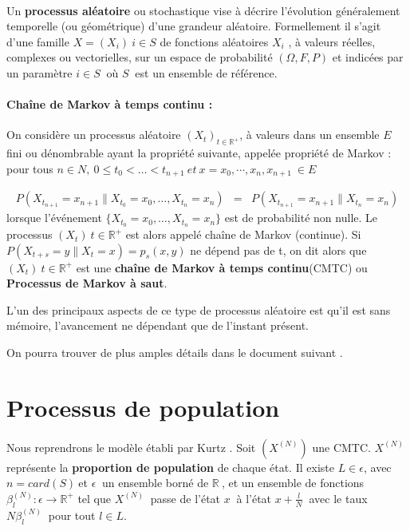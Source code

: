 \documentclass[a4paper,12pt]{report}
\def\D{\displaystyle}
\begin{document}
\paragraph{}
Un \textbf{processus aléatoire} ou stochastique vise à décrire l’évolution généralement
temporelle (ou géométrique) d’une grandeur aléatoire. Formellement il s’agit
d’une famille $\D X = (X_{i} )\ i \in S$ de fonctions aléatoires $\D
X_{i}$ , à valeurs réelles, complexes ou vectorielles, sur un espace
de probabilité $\D (\Omega, F, P)$ et indicées par
un paramètre $\D i \in S\ $ où $\D S\ $ est un ensemble de référence.


\paragraph{Chaîne de Markov à temps continu :}

On considère un processus aléatoire $\D (X_t )_{t\in \mathbb{R}^+}$, à
valeurs dans un ensemble $\D E$ fini ou dénombrable ayant
la propriété suivante, appelée propriété de Markov : \\
pour tous $\D n \in N,\ 0 \leq t_0 < \ldots < t_{n+1}\ et\ x = x_0 ,
\cdots , x_n , x_{n+1}\ \in
E$

\begin{eqnarray*}
P(X_{t_{n+1}} = x_{n+1} \|X_{t_0} = x_0 ,\ldots , X_{t_n} = x_n ) &=& P(X_{t_{n+1}} = x_{n+1} \|X_{t_n} = x_n )
\end{eqnarray*}
lorsque l’événement $\D \{X_{t_0} = x_0 , \ldots , X_{t_n} = x_n \}$ est de probabilité non nulle.
Le processus $\D (X_t )\ t\in \mathbb{R}^+$ est alors appelé chaîne de Markov (continue).
Si $\D P(X_{t+s} = y \|X_t = x) = p_s (x, y)$ ne dépend pas de t, on dit
alors que $\D (X_t )\ t\in \mathbb{R}^+$
est une \textbf{chaîne de Markov à temps continu}(CMTC) ou \textbf{Processus de Markov à saut}.

L'un des principaux aspects de ce type de processus aléatoire est qu'il
est sans mémoire, l'avancement ne dépendant que de l'instant présent.


On pourra trouver de plus amples détails dans le document suivant \cite{courscmtc}.

\section{Processus de population}
Nous reprendrons le modèle  établi par Kurtz \cite{kurtz}. Soit
$\D (X^{(N)})$ une CMTC. $\D X^{(N)}\ $ représente la
\textbf{proportion de population} de chaque état. Il existe $\D L \in
\epsilon$, avec $\D n=card(S)\ $et $\D \epsilon\ $ un ensemble borné de
$\D \mathbb{R}\ $,
et un ensemble de fonctions $\D \beta_l^{(N)}: \epsilon \rightarrow
\mathbb{R}^+$ tel que $\D X^{(N)}\ $ passe de l'état $\D x\ $ à
l'état $\D x+\frac{l}{N}\ $ avec le taux $\D N\beta_l^{(N)}\ $ pour
tout $\D l\in L$.
\end{document}
